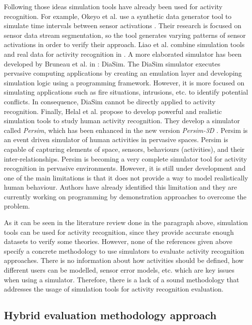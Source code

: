 Following those ideas simulation tools have already been used for activity recognition. For example,   Okeyo et al. use a synthetic data generator tool to simulate time intervals between sensor activations \cite{Okeyo2012a}. Their research is focused on sensor data stream segmentation, so the tool generates varying patterns of sensor activations in order to verify their approach. Liao et al. combine simulation tools and real data for activity recognition in \cite{Liao2006}. A more elaborated simulator has been developed by Bruneau et al. in \cite{Bruneau2009}: DiaSim. The DiaSim simulator executes pervasive computing applications by creating an emulation layer and developing simulation logic using a programming framework. However, it is more focused on simulating applications such as fire situations, intrusions, etc. to identify potential conflicts. In consequence, DiaSim cannot be directly applied to activity recognition. Finally, Helal et al. propose to develop powerful and realistic simulation tools to study human activity recognition. They develop a simulator called \textit{Persim}, which has been enhanced in the new version \textit{Persim-3D} \cite{Helal2012}. Persim is an event driven simulator of human activities in pervasive spaces. Persim is capable of capturing elements of space, sensors, behaviours (activities), and their inter-relationships. Persim is becoming a very complete simulator tool for activity recognition in pervasive environments. However, it is still under development and one of the main limitations is that it does not provide a way to model realistically human behaviour. Authors have already identified this limitation and they are currently working on programming by demonstration approaches to overcome the problem.

As it can be seen in the literature review done in the paragraph above, simulation tools can be used for activity recognition, since they provide accurate enough datasets to verify some theories. However, none of the references given above specify a concrete methodology to use simulators to evaluate activity recognition approaches. There is no information about how activities should be defined, how different users can be modelled, sensor error models, etc. which are key issues when using a simulator. Therefore, there is a lack of a sound methodology that addresses the usage of simulation tools for activity recognition evaluation. 

\subsection{Hybrid evaluation methodology approach}
\label{subsec:evaluation:hybrid}

